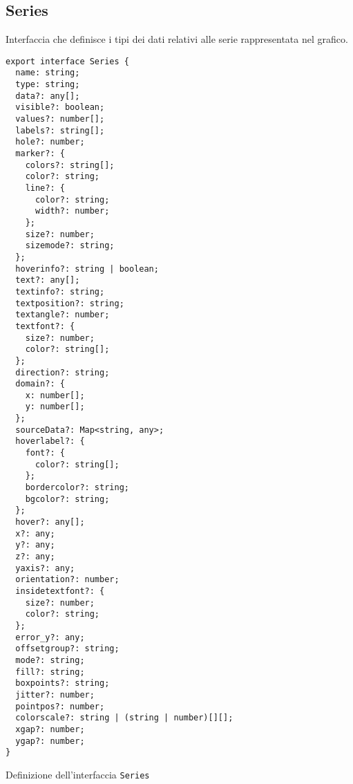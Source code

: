\subsection{Series}
Interfaccia che definisce i tipi dei dati relativi alle serie rappresentata nel grafico.
\begin{verbatim}
export interface Series {
  name: string;
  type: string;
  data?: any[];
  visible?: boolean;
  values?: number[];
  labels?: string[];
  hole?: number;
  marker?: {
    colors?: string[];
    color?: string; 
    line?: {
      color?: string;
      width?: number;
    };
    size?: number;
    sizemode?: string;
  };
  hoverinfo?: string | boolean;
  text?: any[];
  textinfo?: string;
  textposition?: string;
  textangle?: number;
  textfont?: {
    size?: number;
    color?: string[];
  };
  direction?: string;
  domain?: {
    x: number[];
    y: number[];
  };
  sourceData?: Map<string, any>;
  hoverlabel?: {
    font?: {
      color?: string[];
    };
    bordercolor?: string;
    bgcolor?: string;
  };
  hover?: any[];
  x?: any;
  y?: any;
  z?: any;
  yaxis?: any;
  orientation?: number;
  insidetextfont?: {
    size?: number;
    color?: string;
  };
  error_y?: any;
  offsetgroup?: string;
  mode?: string;
  fill?: string;
  boxpoints?: string;
  jitter?: number;
  pointpos?: number;
  colorscale?: string | (string | number)[][];
  xgap?: number;
  ygap?: number;
}
\end{verbatim}
\begin{listing}[H]
      \caption{Definizione dell'interfaccia \texttt{Series}}
      \label{listing:series}
\end{listing}
